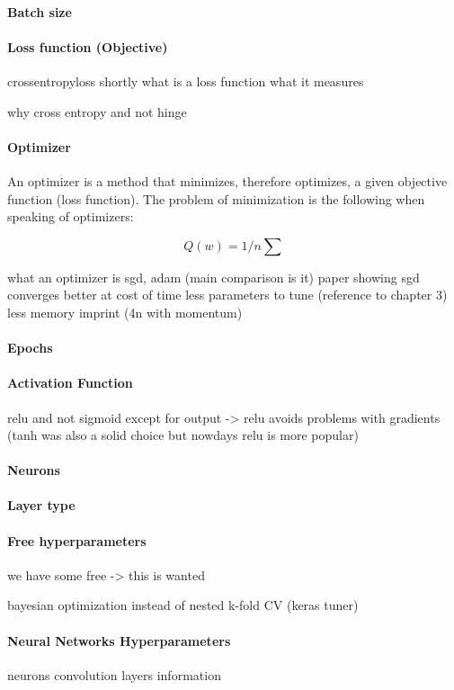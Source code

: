 \paragraph{Batch size}



\paragraph{Loss function (Objective)}
crossentropyloss
shortly what is a loss function
what it measures

why cross entropy and not hinge


\paragraph{Optimizer}
An optimizer is a method that minimizes, therefore optimizes, a given objective function (loss function).
The problem of minimization is the following when speaking of optimizers:

$$ Q(w) = 1/n \sum{}$$

what an optimizer is
sgd, adam (main comparison is it)
paper showing sgd converges better at cost of time
less parameters to tune (reference to chapter 3)
less memory imprint (4n with momentum)


\paragraph{Epochs}


\paragraph{Activation Function}
relu and not sigmoid except for output
-> relu avoids problems with gradients (tanh was also a solid choice but nowdays relu is more popular)

\paragraph{Neurons}

\paragraph{Layer type}

\paragraph{Free hyperparameters}
we have some free
-> this is wanted

bayesian optimization instead of nested k-fold CV (keras tuner)

\paragraph{Neural Networks Hyperparameters}

neurons
convolution layers information